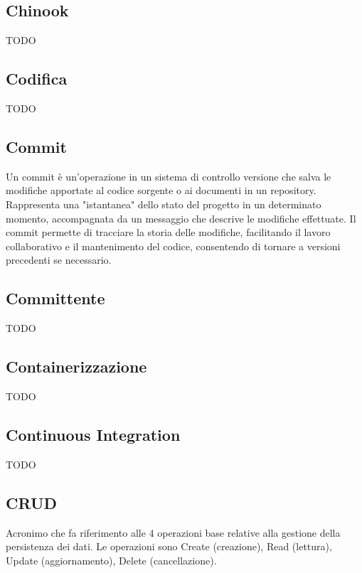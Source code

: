 \subsection*{Chinook}
TODO

\vspace{2em}
\subsection*{Codifica}
TODO

\vspace{2em}
\subsection*{Commit}
Un commit è un'operazione in un sistema di controllo versione che salva le modifiche apportate al codice sorgente o ai documenti in un repository. Rappresenta una "istantanea" dello stato del progetto in un determinato momento, accompagnata da un messaggio che descrive le modifiche effettuate. Il commit permette di tracciare la storia delle modifiche, facilitando il lavoro collaborativo e il mantenimento del codice, consentendo di tornare a versioni precedenti se necessario.

\vspace{2em}
\subsection*{Committente}
TODO

\vspace{2em}
\subsection*{Containerizzazione}
TODO

\vspace{2em}
\subsection*{Continuous Integration}
TODO

\vspace{2em}
\subsection*{CRUD}
Acronimo che fa riferimento alle 4 operazioni base relative alla gestione della persistenza dei dati. Le operazioni sono Create (creazione), Read (lettura), Update (aggiornamento), Delete (cancellazione).

